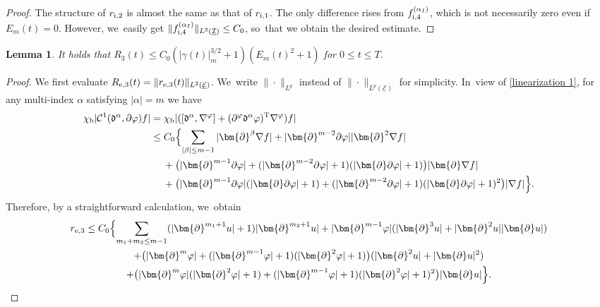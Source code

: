 \documentclass[JEP,XML,SOM,Unicode,NoFloatCountersInSection,published]{cedram}
\newcommand{\cI}{{\mathcal I}}
\newcommand{\cE}{{\mathcal E}}
\newcommand{\ul}[1]{\underline{#1}}
\newtheorem{lemma}[theorem]{Lemma}
\theoremstyle{definition}
\begin{document}
\begin{proof}
The structure of $r_{{\rm i},2}$ is almost the same as that of $r_{{\rm i},1}$.
The only difference rises from $f_{{\rm i},4}^{(\alpha_I)}$, which is not necessarily zero even if $E_m(t)=0$.
However, we~easily get $\|f_{{\rm i},4}^{(\alpha_I)}\|_{L^2(\ul{\cI})} \leq C_0$, so~that we obtain the desired estimate.
\end{proof}

\begin{lemma}\label{lem:EstR3}
It holds that $R_3(t) \leq C_0(|\gamma(t)|_m^{3/2}+1)(E_m(t)^2+1)$ for $0\leq t\leq T$.
\end{lemma}

\begin{proof}
We first evaluate $R_{{\rm e},3}(t)=\|r_{{\rm e},3}(t)\|_{L^2(\ul{\cE})}$. We~write $\|\cdot\|_{L^p}$ instead of $\|\cdot\|_{L^p(\ul{\cE})}$ for simplicity. In~view of \eqref{linearization 1}, for any multi-index $\alpha$ satisfying $|\alpha|=m$ we have
\begin{align*}
\chi_\mathrm{b}|{\mathcal C}^1(\mathfrak{d}^\alpha,\partial \varphi)f|
&= \chi_\mathrm{b}|([\mathfrak{d}^\alpha,\nabla^\varphi]+(\partial^\varphi\mathfrak{d}^\alpha\varphi)^{\rm T}\nabla^\varphi)f| \\
&\leq C_0 \Bigl\{ \sum_{|\beta|\leq m-1}|\bm{\partial}^\beta\nabla f| + |\bm{\partial}^{m-2}\partial\varphi||\bm{\partial}^2\nabla f| \\
&\quad\;
+ \bigl(|\bm{\partial}^{m-1}\partial\varphi| + (|\bm{\partial}^{m-2}\partial\varphi|+1)(|\bm{\partial}\partial\varphi|+1) \bigr)|\bm{\partial}\nabla f| \\
&\quad\;
+ \bigl(|\bm{\partial}^{m-1}\partial\varphi|(|\bm{\partial}\partial\varphi|+1)
+ (|\bm{\partial}^{m-2}\partial\varphi|+1)(|\bm{\partial}\partial\varphi|+1)^2 \bigr) |\nabla f| \Bigr\}.
\end{align*}
Therefore, by a straightforward calculation, we~obtain
\begin{multline*}
r_{{\rm e},3}
\leq C_0 \Bigl\{ \sum_{m_1+m_2\leq m-1}(|\bm{\partial}^{m_1+1}u|+1)|\bm{\partial}^{m_2+1}u|
+ |\bm{\partial}^{m-1}\varphi|(|\bm{\partial}^3u| + |\bm{\partial}^2u||\bm{\partial}u|) \\
+ \bigl(|\bm{\partial}^m\varphi| + (|\bm{\partial}^{m-1}\varphi|+1)(|\bm{\partial}^2\varphi|+1) \bigr)(|\bm{\partial}^2u|+|\bm{\partial}u|^2) \\
+ \bigl(|\bm{\partial}^m\varphi|(|\bm{\partial}^2\varphi|+1) + (|\bm{\partial}^{m-1}\varphi|+1)(|\bm{\partial}^2\varphi|+1)^2 \bigr) |\bm{\partial}u| \Bigr\}.
\end{multline*}


\end{proof}
\end{document}
